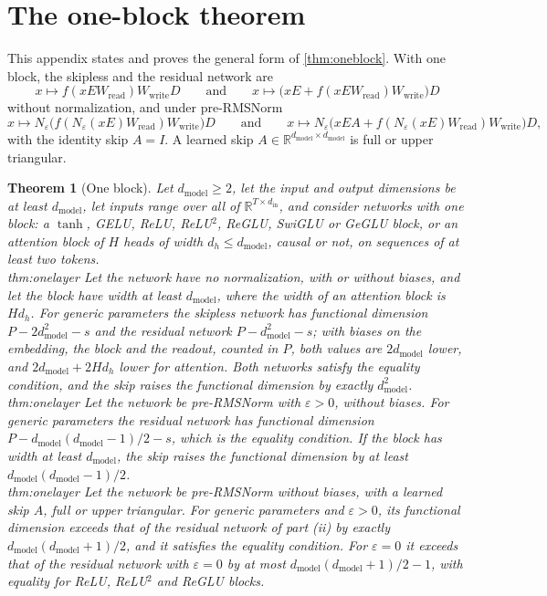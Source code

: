 \documentclass[10pt]{article}
\newtheorem{theorem}{Theorem}[section]
\theoremstyle{definition}
\theoremstyle{remark}
\newcommand{\R}{\mathbb{R}}
\newcommand{\Wread}{W_{\mathrm{read}}}
\newcommand{\Wwrite}{W_{\mathrm{write}}}
\newcommand{\dm}{d_{\mathrm{model}}}
\newcommand{\ptlabel}[1]{\phantomsection\label{#1}}
\newcommand{\stpart}[3]{\ifx\relax#1\relax\else\ptlabel{#1:#2}\fi{\upshape\bfseries\boldmath(#2)\ifx\relax#3\relax\else\ #3.\fi}}
\begin{document}
\section{The one-block theorem}\label{app:onelayer}

This appendix states and proves the general form of \cref{thm:oneblock}. With one block, the skipless and the residual network are
\[
x \mapsto f(xE\Wread)\Wwrite D \qquad\text{and}\qquad x \mapsto \big(xE + f(xE\Wread)\Wwrite\big)D
\]
without normalization, and under pre-RMSNorm
\[
x \mapsto N_\varepsilon\big(f(N_\varepsilon(xE)\Wread)\Wwrite\big)D \qquad\text{and}\qquad x \mapsto N_\varepsilon\big(xEA + f(N_\varepsilon(xE)\Wread)\Wwrite\big)D,
\]
with the identity skip $A = I$. A learned skip $A \in \R^{\dm\times\dm}$ is full or upper triangular.

\begin{theorem}[One block]\label{thm:onelayer}
Let $\dm \ge 2$, let the input and output dimensions be at least $\dm$, let inputs range over all of $\R^{T\times d_{\mathrm{in}}}$, and consider networks with one block: a $\tanh$, GELU, ReLU, ReLU$^2$, ReGLU, SwiGLU or GeGLU block, or an attention block of $H$ heads of width $d_h \le \dm$, causal or not, on sequences of at least two tokens.\\
\stpart{thm:onelayer}{i}{} Let the network have no normalization, with or without biases, and let the block have width at least $\dm$, where the width of an attention block is $Hd_h$. For generic parameters the skipless network has functional dimension $P - 2\dm^2 - s$ and the residual network $P - \dm^2 - s$; with biases on the embedding, the block and the readout, counted in $P$, both values are $2\dm$ lower, and $2\dm + 2Hd_h$ lower for attention. Both networks satisfy the equality condition, and the skip raises the functional dimension by exactly $\dm^2$.\\
\stpart{thm:onelayer}{ii}{} Let the network be pre-RMSNorm with $\varepsilon > 0$, without biases. For generic parameters the residual network has functional dimension $P - \dm(\dm-1)/2 - s$, which is the equality condition. If the block has width at least $\dm$, the skip raises the functional dimension by at least $\dm(\dm-1)/2$.\\
\stpart{thm:onelayer}{iii}{} Let the network be pre-RMSNorm without biases, with a learned skip $A$, full or upper triangular. For generic parameters and $\varepsilon > 0$, its functional dimension exceeds that of the residual network of part (ii) by exactly $\dm(\dm+1)/2$, and it satisfies the equality condition. For $\varepsilon = 0$ it exceeds that of the residual network with $\varepsilon = 0$ by at most $\dm(\dm+1)/2 - 1$, with equality for ReLU, ReLU$^2$ and ReGLU blocks.\\

\end{theorem}
\end{document}
